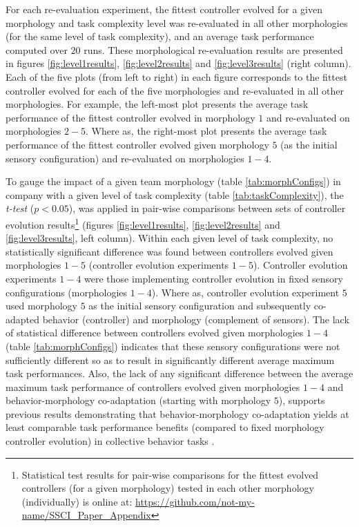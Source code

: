 \documentclass[conference]{IEEEtran}
\begin{document}
For each re-evaluation experiment, the fittest controller evolved for a given morphology and task complexity
level was re-evaluated in all other morphologies (for the same level of task complexity), and an
average task performance computed over $20$ runs.
These morphological re-evaluation results are presented in figures \ref{fig:level1results}, \ref{fig:level2results}
and \ref{fig:level3results} (right column).
Each of the five plots (from left to right) in each figure corresponds to the fittest controller evolved for each of the
five morphologies and re-evaluated in all other morphologies.  For example, the left-most plot presents
the average task performance of the fittest controller evolved in morphology $1$ and re-evaluated on morphologies $2-5$.
Where as, the right-most plot presents the average task performance of the fittest controller evolved given morphology $5$
(as the initial sensory configuration) and re-evaluated on morphologies $1-4$.

To gauge the impact of a given team morphology (table \ref{tab:morphConfigs})
in company with a given level of task complexity (table \ref{tab:taskComplexity}),
the \textit{t-test} \cite{FlanneryTeukolsky1986} ($p < 0.05$),
was applied in pair-wise comparisons between sets of controller evolution
results\footnote{Statistical test results for pair-wise comparisons for the fittest evolved controllers
(for a given morphology) tested in each other morphology (individually) is online at:
\url{https://github.com/not-my-name/SSCI_Paper_Appendix}}
(figures \ref{fig:level1results}, \ref{fig:level2results} and \ref{fig:level3results}, left column).
Within each given level of task complexity, no statistically significant difference was found between
controllers evolved given morphologies $1-5$ (controller evolution experiments $1-5$).
Controller evolution experiments $1-4$ were those implementing controller evolution in fixed sensory
configurations (morphologies $1-4$).  Where as, controller evolution experiment $5$ used morphology $5$
as the initial sensory configuration and subsequently co-adapted behavior (controller) and morphology
(complement of sensors).
The lack of statistical difference between controllers evolved given morphologies $1-4$ (table \ref{tab:morphConfigs})
indicates that these sensory configurations were not sufficiently different so as to result in
significantly different average maximum task performances.
Also, the lack of any significant difference between the average maximum task performance of controllers
evolved given morphologies $1-4$ and behavior-morphology co-adaptation (starting with morphology $5$),
supports previous results demonstrating that behavior-morphology co-adaptation
yields at least comparable task performance benefits (compared to fixed morphology controller evolution)
in collective behavior tasks \cite{HewlandNitschke2015}.
\end{document}
